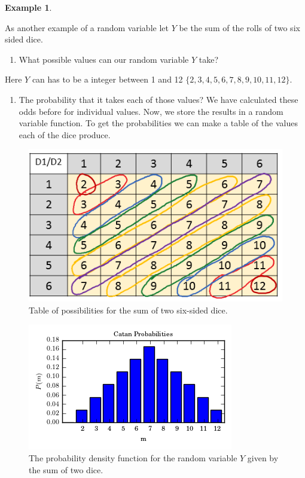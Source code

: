 \documentclass[
]{book}
\providecommand{\tightlist}{%
  \setlength{\itemsep}{0pt}\setlength{\parskip}{0pt}}
\theoremstyle{definition}
\theoremstyle{definition}
\newtheorem{example}{Example}[chapter]
\theoremstyle{definition}
\theoremstyle{definition}
\theoremstyle{remark}
\begin{document}
\begin{example}
\protect\hypertarget{exm:unnamed-chunk-255}{}\label{exm:unnamed-chunk-255}

As another example of a random variable let \(Y\) be the sum of the rolls of two six sided dice.

\begin{enumerate}
\def\labelenumi{\arabic{enumi}.}
\tightlist
\item
  What possible values can our random variable \(Y\) take?
\end{enumerate}

Here \(Y\) can has to be a integer between 1 and 12 \(\{2,3,4,5,6,7,8,9,10,11,12\}\).

\begin{enumerate}
\def\labelenumi{\arabic{enumi}.}
\setcounter{enumi}{1}
\tightlist
\item
  The probability that it takes each of those values?
  We have calculated these odds before for individual values. Now, we store the results in a random variable function. To get the probabilities we can make a table of the values each of the dice produce.
\end{enumerate}

\end{example}

\begin{figure}
\includegraphics[width=0.5\linewidth]{catan1} \caption{Table of possibilities for the sum of two six-sided dice.}\label{fig:addCatanTable}
\end{figure}

\begin{figure}
\includegraphics[width=0.5\linewidth]{CatanPMF} \caption{The probability density function for the random variable $Y$ given by the sum of two dice.}\label{fig:addCatanPMF}
\end{figure}
\end{document}
